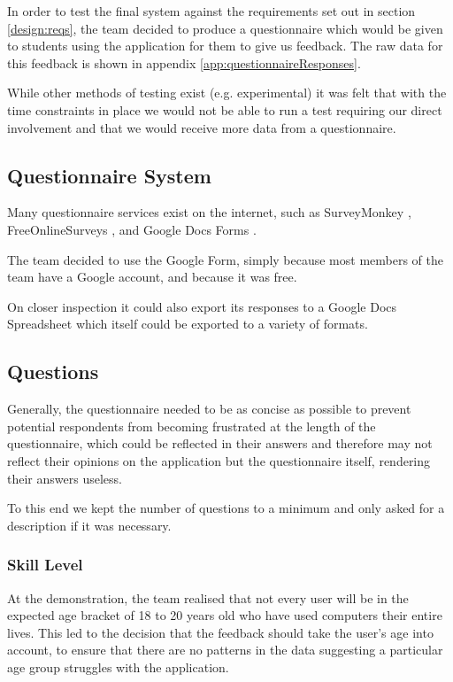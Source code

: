 In order to test the final system against the requirements set out in
section \ref{design:reqs}, the team decided to produce a
questionnaire which would be given to students using the application
for them to give us feedback.
The raw data for this feedback is shown in appendix
\ref{app:questionnaireResponses}.

While other methods of testing exist (e.g. experimental) it was felt
that with the time constraints in place we would not be able to run a
test requiring our direct involvement and that we would receive more
data from a questionnaire.

\subsection{Questionnaire System}

Many questionnaire services exist on the internet, such as
SurveyMonkey \cite{surveyMonkey}, FreeOnlineSurveys
\cite{freeOnlineSurveys}, and Google Docs Forms
\cite{googleDocsForms}.

The team decided to use the Google Form, simply because most members
of the team have a Google account, and because it was free.

On closer inspection it could also export its responses to a Google
Docs Spreadsheet which itself could be exported to a variety of
formats.

\subsection{Questions}

Generally, the questionnaire needed to be as concise as possible to
prevent potential respondents from becoming frustrated at the length
of the questionnaire, which could be reflected in their answers and
therefore may not reflect their opinions on the application but the
questionnaire itself, rendering their answers useless.

To this end we kept the number of questions to a minimum and only
asked for a description if it was necessary.

\subsubsection{Skill Level}
At the demonstration, the team realised that not every user will be in
the expected age bracket of 18 to 20 years old who have used computers
their entire lives.
This led to the decision that the feedback should take the user's age
into account, to ensure that there are no patterns in the data
suggesting a particular age group struggles with the application.

